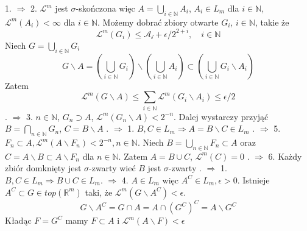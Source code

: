 
	1. $\Longrightarrow$ 2. $\mathcal{L}^m$ jest $\sigma$-skończona więc $A = \bigcup_{i \in \mathbb{N}} A_i$, $A_i \in L_m$ dla $i \in \mathbb{N}$, $\mathcal{L}^m(A_i) < \infty$ dla $i \in \mathbb{N}$. Możemy dobrać zbiory otwarte $G_i$, $i \in \mathbb{N}$, takie że $$ \mathcal{L}^m(G_i) \leq \mathcal{A_i} + \epsilon / 2^{2 + i}, \quad i \in \mathbb{N} $$  Niech $G = \bigcup_{i \in \mathbb{N}} G_i$ $$ G \backslash A = (\bigcup_{i \in \mathbb{N}} G_i) \backslash (\bigcup_{i \in \mathbb{N}} A_i) \subset (\bigcup_{i \in \mathbb{N}} G_i \backslash A_i) $$ Zatem $$ \mathcal{L}^m(G \backslash A) \leq \sum_{i \in \mathbb{N}} \mathcal{L}^m(G_i \backslash A_i) \leq \epsilon/2 $$. $\Longrightarrow$ 3. $n \in \mathbb{N}$, $G_n \supset A$, $\mathcal{L}^m(G_n \backslash A) < 2^{-n}$. Dalej wystarczy przyjąć $B = \bigcap_{n \in \mathbb{N}} G_n$, $C = B \backslash A$ . $\Longrightarrow$ 1. $B, C \in L_m \Longrightarrow A = B \backslash C \in L_m$ . $\Longrightarrow$ 5. $F_n \subset A, \mathcal{L}^m(A \backslash F_n) < 2^{-n}, n \in \mathbb{N}$. Niech $B = \bigcup_{n \in \mathbb{N}} F_n \subset A$ oraz $C = A \backslash B \subset A \backslash F_n$ dla $n \in \mathbb{N}$. Zatem $A = B \cup C$, $\mathcal{L}^m(C)=0$  . $\Longrightarrow$ 6. Każdy zbiór domknięty jest $\sigma$-zwarty wieć $B$ jest $\sigma$-zwarty . $\Longrightarrow$ 1. $B,C \in L_m \Longrightarrow B \cup C \in L_m$. $\Longrightarrow$ 4. $A \in L_m$ więc $A^C \in L_m, \epsilon > 0$. Istnieje $A^C \subset G \in top(\mathbb{R}^m)$ taki, że $\mathcal{L}^m(G \backslash A^C) < \epsilon$. $$ G \backslash A^C = G \cap A = A \cap (G^C)^C = A \backslash G^C $$ Kładąc $F = G^C$ mamy $F \subset A$ i $\mathcal{L}^m(A \backslash F) < \epsilon$ \newline
